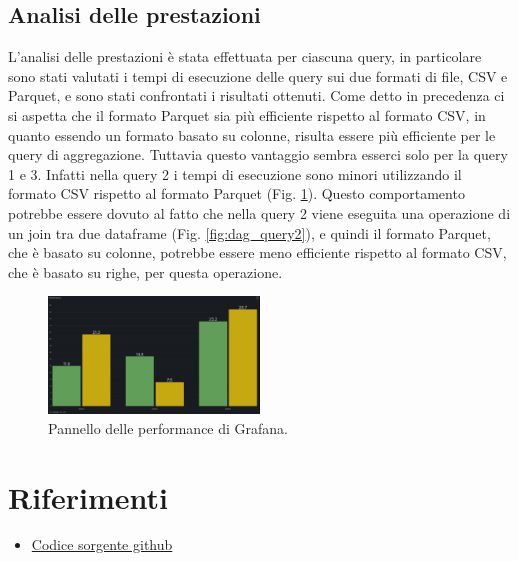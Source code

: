 \documentclass[conference]{IEEEtran}
\begin{document}
\subsection{Analisi delle prestazioni}
L'analisi delle prestazioni è stata effettuata per ciascuna query, in particolare sono stati valutati i tempi di esecuzione delle query sui due formati di file, CSV e Parquet, e sono stati confrontati i risultati ottenuti.
Come detto in precedenza ci si aspetta che il formato Parquet sia più efficiente rispetto al formato CSV, in quanto essendo un formato basato su colonne, risulta essere più efficiente per le query di aggregazione.
Tuttavia questo vantaggio sembra esserci solo per la query 1 e 3. Infatti nella query 2 i tempi di esecuzione sono minori utilizzando il formato CSV rispetto al formato Parquet (Fig. \ref{fig:performance_panel}).
Questo comportamento potrebbe essere dovuto al fatto che nella query 2 viene eseguita una operazione di un join tra due dataframe (Fig. \ref{fig:dag_query2}), e quindi il formato Parquet, che è basato su colonne, potrebbe essere meno efficiente rispetto al formato CSV, che è basato su righe, per questa operazione.

\begin{figure}[H]
    \centerline{\includegraphics[width=0.5\textwidth]{res/performance_panel.png}}
    \caption{Pannello delle performance di Grafana.}
    \label{fig:performance_panel}
\end{figure}

\section{Riferimenti}
\begin{itemize}
    \item \href{https://github.com/matteo-conti-97/hard_disk_failure_data_processing}{Codice sorgente github}
\end{itemize}
\vspace{12pt}
\end{document}

